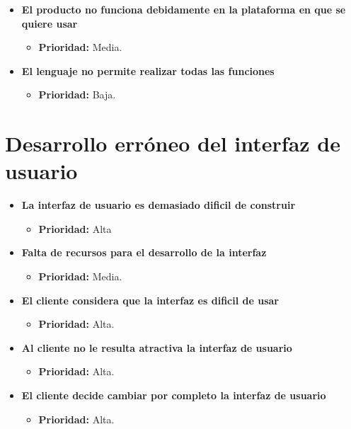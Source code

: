 \documentclass[spanish,a4paper,12pt]{report}	%
\begin{document}
\begin{itemize}
		\item \textbf{El producto no funciona debidamente en la plataforma en que se quiere usar}
			\begin{itemize}
				\item \textbf{Prioridad: }Media.
			\end{itemize}
		
		\item \textbf{El lenguaje no permite realizar todas las funciones}
			\begin{itemize}
				\item \textbf{Prioridad: }Baja.
			\end{itemize}
	\end{itemize}

%
\section{Desarrollo erróneo del interfaz de usuario}
	\begin{itemize}
		\item \textbf{La interfaz de usuario es demasiado dificil de construir}
			\begin{itemize}
				\item \textbf{Prioridad: }Alta
			\end{itemize}
		
		\item \textbf{Falta de recursos para el desarrollo de la interfaz}
			\begin{itemize}
				\item \textbf{Prioridad: }Media.
			\end{itemize}
		
		\item \textbf{El cliente considera que la interfaz es dificil de usar}
			\begin{itemize}
				\item \textbf{Prioridad: }Alta.
			\end{itemize}
		
		\item \textbf{Al cliente no le resulta atractiva la interfaz de usuario}
			\begin{itemize}
				\item \textbf{Prioridad: }Alta.
			\end{itemize}
		
		\item \textbf{El cliente decide cambiar por completo la interfaz de usuario}
			\begin{itemize}
				\item \textbf{Prioridad: }Alta.
			\end{itemize}
	\end{itemize}
%
\end{document}
